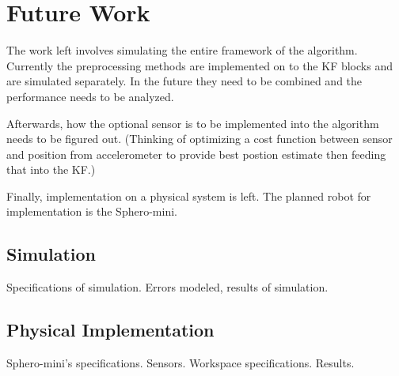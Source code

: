 \chapter{Future Work}
\label{experimentchapter}

The work left involves simulating the entire framework of the algorithm.
Currently the preprocessing methods are implemented on to the KF blocks and are 
simulated separately. In the future they need to be combined and the performance
needs to be analyzed.

Afterwards, how the optional sensor is to be implemented into the algorithm needs
to be figured out. (Thinking of optimizing a cost function between sensor and position 
from accelerometer to provide best postion estimate then feeding that into the 
KF.)

Finally, implementation on a physical system is left. The planned robot for 
implementation is the Sphero-mini.

\section{Simulation}

Specifications of simulation. Errors modeled, results of simulation. 

\section{Physical Implementation}

Sphero-mini's specifications. Sensors. Workspace specifications. Results. 
